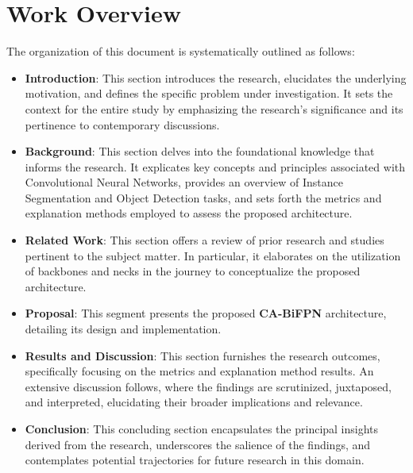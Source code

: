 \section{Work Overview}
The organization of this document is systematically outlined as follows:

\begin{itemize}
    \item \textbf{Introduction}: This section introduces the research, elucidates the underlying motivation, and defines the specific problem under investigation. It sets the context for the entire study by emphasizing the research's significance and its pertinence to contemporary discussions.
    \item \textbf{Background}: This section delves into the foundational knowledge that informs the research. It explicates key concepts and principles associated with Convolutional Neural Networks, provides an overview of Instance Segmentation and Object Detection tasks, and sets forth the metrics and explanation methods employed to assess the proposed architecture.
    \item \textbf{Related Work}: This section offers a review of prior research and studies pertinent to the subject matter. In particular, it elaborates on the utilization of backbones and necks in the journey to conceptualize the proposed architecture.
    \item \textbf{Proposal}: This segment presents the proposed \textbf{CA-BiFPN} architecture, detailing its design and implementation.
    \item \textbf{Results and Discussion}: This section furnishes the research outcomes, specifically focusing on the metrics and explanation method results. An extensive discussion follows, where the findings are scrutinized, juxtaposed, and interpreted, elucidating their broader implications and relevance.
    \item \textbf{Conclusion}: This concluding section encapsulates the principal insights derived from the research, underscores the salience of the findings, and contemplates potential trajectories for future research in this domain.
\end{itemize}
